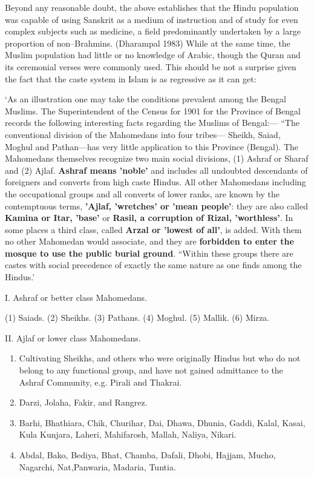 Beyond any reasonable doubt, the above establishes that the Hindu population was capable of using Sanskrit as a medium of instruction and of study for even complex subjects such as medicine, a field predominantly undertaken by a large proportion of non–Brahmins. (Dharampal 1983) While at the same time, the Muslim population had little or no knowledge of Arabic, though the Quran and its ceremonial verses were commonly used. This should be not a surprise given the fact that the caste system in Islam is as regressive as it can get:

\begin{myquote}
‘As an illustration one may take the conditions prevalent among the Bengal Muslims. The Superintendent of the Census for 1901 for the Province of Bengal records the following interesting facts regarding the Muslims of Bengal:— “The conventional division of the Mahomedans into four tribes— Sheikh, Saiad, Moghul and Pathan—has very little application to this Province (Bengal). The Mahomedans themselves recognize two main social divisions, (1) Ashraf or Sharaf and (2) Ajlaf. \textbf{Ashraf means 'noble'} and includes all undoubted descendants of foreigners and converts from high caste Hindus. All other Mahomedans including the occupational groups and all converts of lower ranks, are known by the contemptuous terms, \textbf{'Ajlaf, 'wretches' or 'mean people'}: they are also called \textbf{Kamina or Itar, 'base'} or \textbf{Rasil, a corruption of Rizal, 'worthless'}. In some places a third class, called \textbf{Arzal or 'lowest of all'}, is added. With them no other Mahomedan would associate, and they are \textbf{forbidden to enter the mosque to use the public burial ground}. “Within these groups there are castes with social precedence of exactly the same nature as one finds among the Hindus.'
\end{myquote}

I. Ashraf or better class Mahomedans.

(1) Saiads. (2) Sheikhs. (3) Pathans. (4) Moghul. (5) Mallik. (6) Mirza.

II. Ajlaf or lower class Mahomedans.

\begin{enumerate}
\item Cultivating Sheikhs, and others who were originally Hindus but who do not belong to any functional group, and have not gained admittance to the Ashraf Community, e.g. Pirali and Thakrai.

 \item Darzi, Jolaha, Fakir, and Rangrez.

 \item Barhi, Bhathiara, Chik, Churihar, Dai, Dhawa, Dhunia, Gaddi, Kalal, Kasai, Kula Kunjara, Laheri, Mahifarosh, Mallah, Naliya, Nikari.

 \item Abdal, Bako, Bediya, Bhat, Chamba, Dafali, Dhobi, Hajjam, Mucho, Nagarchi, Nat,Panwaria, Madaria, Tuntia.

\end{enumerate}

